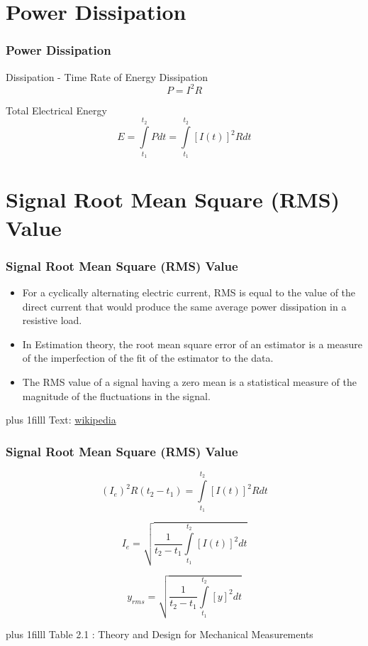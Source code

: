 \documentclass[fleqn]{beamer} %
\newcommand{\sectiontitleII}{Power Dissipation}
\newcommand{\sectiontitleIII}{Signal Root Mean Square (RMS) Value}
\newcommand{\btVFill}{\vskip0pt plus 1filll}
\begin{document}
\section{\sectiontitleII}	
	\begin{frame}[label=sectionII] \small
		\frametitle{\sectiontitleII}
Dissipation - Time Rate of Energy Dissipation    \[ P=I^2R \]  
	
	Total Electrical Energy \hspace{5mm} \[ E =\int\limits_{t_1}^{t_2}P dt=\int\limits_{t_1}^{t_2}[I(t)]^2R dt \]
		
		
	\end{frame}

	
\section{\sectiontitleIII}	

\begin{frame}[label=sectionIII] \small
\frametitle{\sectiontitleIII}
\bigskip

	\begin{itemize}
	\item For a cyclically alternating electric current, RMS is equal to the value of the direct current that would produce the same average power dissipation in a resistive load.
	\item In Estimation theory, the root mean square error of an estimator is a measure of the imperfection of the fit of the estimator to the data.  
	\item The RMS value of a signal having a zero mean is a statistical measure of the magnitude of the fluctuations in the signal.
	\end{itemize}

\btVFill
\tiny{Text: \href{https://en.wikipedia.org/wiki/Root_mean_square\#In_electrical_engineering}{wikipedia}}		

\end{frame}

\begin{frame}[label=sectionIII] \small
\frametitle{\sectiontitleIII}
\bigskip

\[(I_e)^2R(t_2-t_1)=\int\limits_{t_1}^{t_2}[I(t)]^2R dt\]

\[I_e = \sqrt{\frac{1}{t_2-t_1}\int\limits_{t_1}^{t_2}[I(t)]^2 dt} \]

\vspace{10mm}

\[y_{rms} = \sqrt{\frac{1}{t_2-t_1}\int\limits_{t_1}^{t_2}[y]^2 dt} \]


\btVFill
\tiny{Table 2.1 : Theory and Design for Mechanical Measurements}	
\end{frame}
\end{document}
